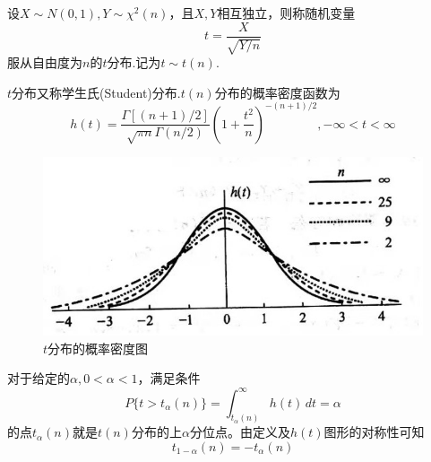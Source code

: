 \begin{definition}[$t$分布]
    设$X\sim N(0,1),Y\sim \chi^2(n)$，且$X,Y$相互独立，则称随机变量
    $$t=\frac{X}{\sqrt{Y/n}}$$
    服从自由度为$n$的{\heiti $t$分布}.记为$t\sim t(n)$.

    $t$分布又称{\heiti 学生氏}(Student){\heiti 分布}.$t(n)$分布的概率密度函数为
    $$h(t)=\frac{\Gamma [(n+1)/2]}{\sqrt{\pi n} \Gamma (n/2)}{\left(1+\frac{t^2}{n}\right)}^{-(n+1)/2},-\infty<t<\infty$$
    \begin{figure}[H]
        \centering
        \includegraphics[scale=0.5]{2.jpg}
        \caption{$t$分布的概率密度图}
    \end{figure} 
\end{definition}

\begin{definition}[$t$分布的上分位点]
    对于给定的$\alpha,0<\alpha<1$，满足条件
    $$P\{t>t_\alpha(n)\}=\int_{t_\alpha(n)}^\infty h(t)\,dt=\alpha$$
    的点$t_\alpha(n)$就是$t(n)$分布的上$\alpha$分位点。由定义及$h(t)$图形的对称性可知
    $$t_{1-\alpha}(n)=-t_\alpha(n)$$
\end{definition}

